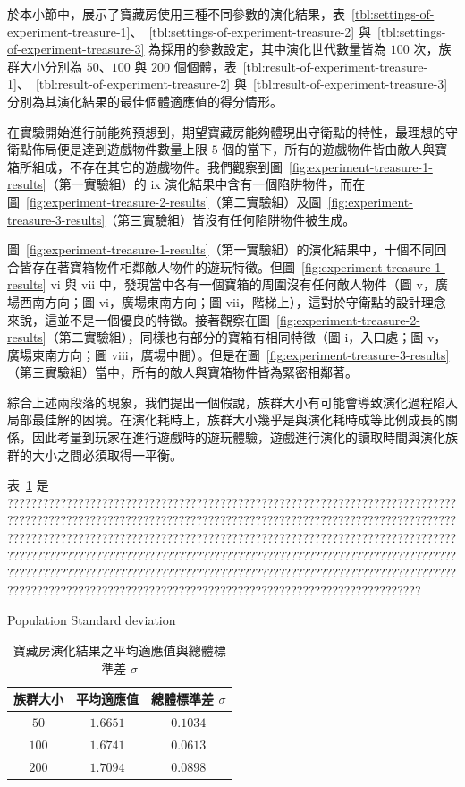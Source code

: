 於本小節中，展示了寶藏房使用三種不同參數的演化結果，表~\ref{tbl:settings-of-experiment-treasure-1}、~\ref{tbl:settings-of-experiment-treasure-2} 與~\ref{tbl:settings-of-experiment-treasure-3} 為採用的參數設定，其中演化世代數量皆為 $100$ 次，族群大小分別為 $50$、$100$ 與 $200$ 個個體，表~\ref{tbl:result-of-experiment-treasure-1}、~\ref{tbl:result-of-experiment-treasure-2} 與~\ref{tbl:result-of-experiment-treasure-3} 分別為其演化結果的最佳個體適應值的得分情形。

在實驗開始進行前能夠預想到，期望寶藏房能夠體現出守衛點的特性，最理想的守衛點佈局便是達到遊戲物件數量上限 $5$ 個的當下，所有的遊戲物件皆由敵人與寶箱所組成，不存在其它的遊戲物件。我們觀察到圖~\ref{fig:experiment-treasure-1-results}（第一實驗組）的 ix 演化結果中含有一個陷阱物件，而在圖~\ref{fig:experiment-treasure-2-results}（第二實驗組）及圖~\ref{fig:experiment-treasure-3-results}（第三實驗組）皆沒有任何陷阱物件被生成。

圖~\ref{fig:experiment-treasure-1-results}（第一實驗組）的演化結果中，十個不同回合皆存在著寶箱物件相鄰敵人物件的遊玩特徵。但圖~\ref{fig:experiment-treasure-1-results} vi 與 vii 中，發現當中各有一個寶箱的周圍沒有任何敵人物件（圖 v，廣場西南方向；圖 vi，廣場東南方向；圖 vii，階梯上），這對於守衛點的設計理念來說，這並不是一個優良的特徵。接著觀察在圖~\ref{fig:experiment-treasure-2-results}（第二實驗組），同樣也有部分的寶箱有相同特徵（圖 i，入口處；圖 v，廣場東南方向；圖 viii，廣場中間）。但是在圖~\ref{fig:experiment-treasure-3-results} （第三實驗組）當中，所有的敵人與寶箱物件皆為緊密相鄰著。

綜合上述兩段落的現象，我們提出一個假說，族群大小有可能會導致演化過程陷入局部最佳解的困境。在演化耗時上，族群大小幾乎是與演化耗時成等比例成長的關係，因此考量到玩家在進行遊戲時的遊玩體驗，遊戲進行演化的讀取時間與演化族群的大小之間必須取得一平衡。

表~\ref{tbl:result-of-experiment-treasure-avg-sd} 是 ??????????????????????????????????????????????????????????????????????????????????????????????????????????????????????????????????????????????????????????????????????????????????????????????????????????????????????????????????????????????????????????????????????????????????????????????????????????????????????????????????????????????????????????????????????????????????????????????????????????????????????????????????????????????????????????????????

Population Standard deviation

\begin{table}[H]
  \centering
  \caption{寶藏房演化結果之平均適應值與總體標準差 $\sigma$}
  \label{tbl:result-of-experiment-treasure-avg-sd}
  \bigskip
  \vspace{-5mm}
  \begin{tabular}[t]{ | c | c | c | }
    \hline
    族群大小 & 平均適應值 & 總體標準差 $\sigma$ \\\hline
    $50$  & $1.6651$ & $0.1034$ \\\hline
    $100$ & $1.6741$ & $0.0613$ \\\hline
    $200$ & $1.7094$ & $0.0898$ \\\hline
  \end{tabular}
\end{table}

